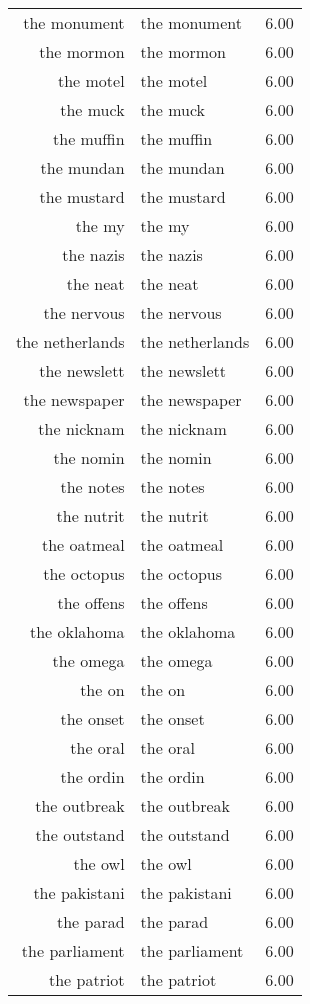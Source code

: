 \begin{table}[ht]
\begin{tabular}{rlr}
  the monument & the monument & 6.00 \\ 
  the mormon & the mormon & 6.00 \\ 
  the motel & the motel & 6.00 \\ 
  the muck & the muck & 6.00 \\ 
  the muffin & the muffin & 6.00 \\ 
  the mundan & the mundan & 6.00 \\ 
  the mustard & the mustard & 6.00 \\ 
  the my & the my & 6.00 \\ 
  the nazis & the nazis & 6.00 \\ 
  the neat & the neat & 6.00 \\ 
  the nervous & the nervous & 6.00 \\ 
  the netherlands & the netherlands & 6.00 \\ 
  the newslett & the newslett & 6.00 \\ 
  the newspaper & the newspaper & 6.00 \\ 
  the nicknam & the nicknam & 6.00 \\ 
  the nomin & the nomin & 6.00 \\ 
  the notes & the notes & 6.00 \\ 
  the nutrit & the nutrit & 6.00 \\ 
  the oatmeal & the oatmeal & 6.00 \\ 
  the octopus & the octopus & 6.00 \\ 
  the offens & the offens & 6.00 \\ 
  the oklahoma & the oklahoma & 6.00 \\ 
  the omega & the omega & 6.00 \\ 
  the on & the on & 6.00 \\ 
  the onset & the onset & 6.00 \\ 
  the oral & the oral & 6.00 \\ 
  the ordin & the ordin & 6.00 \\ 
  the outbreak & the outbreak & 6.00 \\ 
  the outstand & the outstand & 6.00 \\ 
  the owl & the owl & 6.00 \\ 
  the pakistani & the pakistani & 6.00 \\ 
  the parad & the parad & 6.00 \\ 
  the parliament & the parliament & 6.00 \\ 
  the patriot & the patriot & 6.00 \\ 

\end{tabular}
\end{table}
